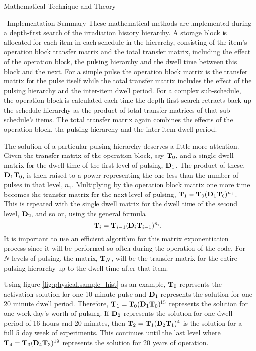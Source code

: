 \begin{chapter}{Mathematical Technique and Theory\label{chap:math}}
\begin{section}{\ALARA\  Implementation Summary}
    These mathematical methods are implemented during a depth-first
    search of the irradiation history hierarchy.  A storage block is
    allocated for each item in each schedule in the hierarchy,
    consisting of the item's operation block transfer matrix and the
    total transfer matrix, including the effect of the operation
    block, the pulsing hierarchy and the dwell time between this block
    and the next.  For a simple pulse the operation block matrix is
    the transfer matrix for the pulse itself while the total transfer
    matrix includes the effect of the pulsing hierarchy and the
    inter-item dwell period.  For a complex sub-schedule, the
    operation block is calculated each time the depth-first search
    retracts back up the schedule hierarchy as the product of total
    transfer matrices of that sub-schedule's items.  The total
    transfer matrix again combines the effects of the operation block,
    the pulsing hierarchy and the inter-item dwell period.
  
    The solution of a particular pulsing hierarchy deserves a little
    more attention.  Given the transfer matrix of the operation block,
    say $\mbox{$\mathbf{T}$}_0$, and a single dwell matrix for the dwell time of
    the first level of pulsing, $\mbox{$\mathbf{D}$}_1$.  The product of these,
    $\mbox{$\mathbf{D}$}_1\mbox{$\mathbf{T}$}_0$, is then raised to a power representing the
    one less than the number of pulses in that level, $n_1$.
    Multiplying by the operation block matrix one more time becomes
    the transfer matrix for the next level of pulsing, $\mbox{$\mathbf{T}$}_1 =
    \mbox{$\mathbf{T}$}_0(\mbox{$\mathbf{D}$}_1\mbox{$\mathbf{T}$}_0)^{n_1}$.  This is repeated with the
    single dwell matrix for the dwell time of the second level,
    $\mbox{$\mathbf{D}$}_2$, and so on, using the general formula\cite{spangler}
    \begin{equation}
      \mbox{$\mathbf{T}$}_i = \mbox{$\mathbf{T}$}_{i-1}(\mbox{$\mathbf{D}$}_{i}\mbox{$\mathbf{T}$}_{i-1})^{n_i}.
      \label{eqn:pulsing.recurse}
    \end{equation}
    It is important to use an efficient algorithm\cite{UofT_csc280}
    for this matrix exponentiation process since it will be performed
    so often during the operation of the code.  For $N$ levels of
    pulsing, the matrix, $\mbox{$\mathbf{T}$}_{N}$, will be the transfer matrix
    for the entire pulsing hierarchy up to the dwell time after that
    item.
    
    Using figure \ref{fig:physical.sample_hist} as an example,
    $\mbox{$\mathbf{T}$}_0$ represents the activation solution for one 10 minute
    pulse and $\mbox{$\mathbf{D}$}_1$ represents the solution for one 20 minute
    dwell period.  Therefore, $\mbox{$\mathbf{T}$}_1 =
    \mbox{$\mathbf{T}$}_0(\mbox{$\mathbf{D}$}_1\mbox{$\mathbf{T}$}_0)^{15}$ represents the solution for
    one work-day's worth of pulsing.  If $\mbox{$\mathbf{D}$}_2$ represents the
    solution for one dwell period of 16 hours and 20 minutes, then
    $\mbox{$\mathbf{T}$}_2 = \mbox{$\mathbf{T}$}_1(\mbox{$\mathbf{D}$}_2\mbox{$\mathbf{T}$}_1)^{4}$ is the solution
    for a full 5 day week of experiments.  This continues until the
    last level where $\mbox{$\mathbf{T}$}_4 = \mbox{$\mathbf{T}$}_3(\mbox{$\mathbf{D}$}_4\mbox{$\mathbf{T}$}_3)^{19}$
    represents the solution for 20 years of operation.
    

\end{section}
\end{chapter}
